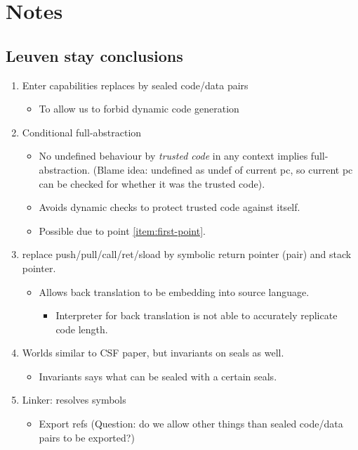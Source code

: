 \documentclass[a4paper]{article}
\begin{document}
\section{Notes}
\subsection{Leuven stay conclusions}
\begin{enumerate}
\item Enter capabilities replaces by sealed code/data pairs \label{item:first-point}
  \begin{itemize}
  \item To allow us to forbid dynamic code generation
  \end{itemize}
\item Conditional full-abstraction
  \begin{itemize}
  \item No undefined behaviour by \emph{trusted code} in any context implies full-abstraction. (Blame idea: undefined as undef of current pc, so current pc can be checked for whether it was the trusted code).
  \item Avoids dynamic checks to protect trusted code against itself.
  \item Possible due to point \ref{item:first-point}.
  \end{itemize}
\item replace push/pull/call/ret/sload by symbolic return pointer (pair) and stack pointer.
  \begin{itemize}
  \item Allows back translation to be embedding into source language.
    \begin{itemize}
    \item Interpreter for back translation is not able to accurately replicate code length.
    \end{itemize}
  \end{itemize}
\item Worlds similar to CSF paper, but invariants on seals as well.
  \begin{itemize}
  \item Invariants says what can be sealed with a certain seals.
  \end{itemize}
\item Linker: resolves symbols
  \begin{itemize}
  \item Export refs (Question: do we allow other things than sealed code/data pairs to be exported?)

\end{itemize}
\end{enumerate}
\end{document}
